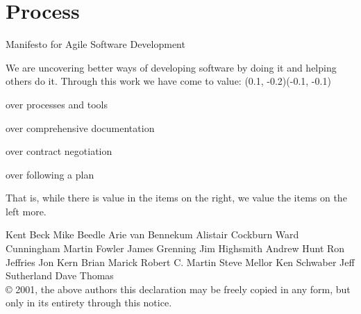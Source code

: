\documentclass[14pt]{beamer}
\begin{document}
  \section{Process}
    \blankscreen{}
    \begin{frame}{\large Manifesto for Agile Software Development}

      {\footnotesize \color{black} We are uncovering better ways of developing
      software by doing it and helping others do it.
      Through this work we have come to value:}
      \vfill
      (0.1, -0.2)(-0.1, -0.1)
      \begin{description}
        \begin{small}
          \item [Individuals and interactions] over processes and tools
          \item [Working software] over comprehensive documentation
          \item [Customer collaboration] over contract negotiation
          \item [Responding to change] over following a plan
        \end{small}
      \end{description}
      \vfill
      {\footnotesize That is, while there is value in the items on
      the right, we value the items on the left more.}

      \begin{block}{}
        {\tiny
          Kent Beck\hspace{5pt}
          Mike Beedle\hspace{5pt}
          Arie van Bennekum\hspace{5pt}
          Alistair Cockburn\hspace{5pt}
          Ward Cunningham\hspace{5pt}
          Martin Fowler\hspace{5pt}
          James Grenning\hspace{5pt}
          Jim Highsmith\hspace{5pt}
          Andrew Hunt\hspace{5pt}
          Ron Jeffries\hspace{5pt}
          Jon Kern\hspace{5pt}
          Brian Marick\hspace{5pt}
          Robert C. Martin\hspace{5pt}
          Steve Mellor\hspace{5pt}
          Ken Schwaber\hspace{5pt}
          Jeff Sutherland\hspace{5pt}
          Dave Thomas\\
          © 2001, the above authors
          this declaration may be freely copied in any form, but only in its entirety through this notice.}
      \end{block}

    \end{frame}
\end{document}
